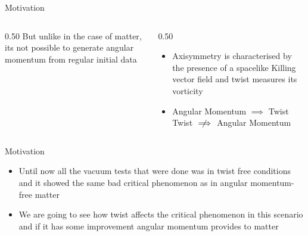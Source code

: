 \documentclass[9pt]{beamer}
\begin{document}
\begin{frame}{Motivation}
\vspace{-5pt}
\begin{columns}[T]
\begin{column}{0.50\linewidth}
But unlike in the case of matter, its not possible to generate angular momentum from regular initial data 

\end{column}  
\begin{column}{0.50\linewidth}
\begin{alertblock}{}
    \begin{itemize}
        \item Axisymmetry is characterised by the presence of a spacelike Killing vector field and twist measures its vorticity
         \item Angular Momentum $\implies$ Twist Twist $\centernot\implies$ Angular Momentum
    \end{itemize}
\end{alertblock}
\end{column}
\end{columns}

\begin{alertblock}{Motivation}
\begin{itemize}
    \item Until now all the vacuum tests that were done was in twist free conditions and it showed the same bad critical phenomenon as in angular momentum-free matter
    \item We are going to see how twist affects the critical phenomenon in this scenario and if it has some improvement angular momentum provides to matter
\end{itemize} 
\end{alertblock}
\end{frame}
\end{document}
